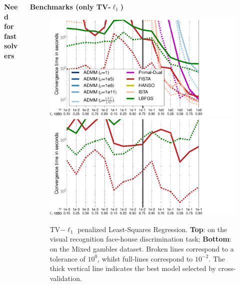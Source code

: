 \documentclass[french]{STIC_poster}
\begin{document}
\begin{frame}[t]
\begin{columns}[t]
\begin{column}{.48\linewidth}
\begin{nbox}[\textwidth]{\textbf{Need for fast solvers}}
                                  \end{nbox}
			\end{column}
			\hfill
			\begin{column}{.48\linewidth}
			  \begin{nbox}[\textwidth]{\textbf{Benchmarks (only TV-$\ell_1$)}}                          
                            \begin{figure}
                              \includegraphics[width=1.2\linewidth]{bench/haxby_mse.pdf}%
                              \hspace{-.09\linewidth}%
                              \includegraphics[width=1.2\linewidth]{bench/poldrack_mse.pdf}
                              \caption{TV$-\ell_1$ penalized Least-Squares Regression. \textbf{Top}:
                                on the visual recognition  face-house discrimination task; \textbf{Bottom}: on the
                                Mixed gambles dataset. Broken lines correspond to a tolerance of $10^{0}$,
                                whilst full-lines correspond to $10^{-2}$. The thick vertical line
                                indicates the best model selected by cross-validation.}
                              \label{Fig:MSEtimes}
                            \end{figure}
                            

\end{nbox}
\end{column}
\end{columns}
\end{frame}
\end{document}
